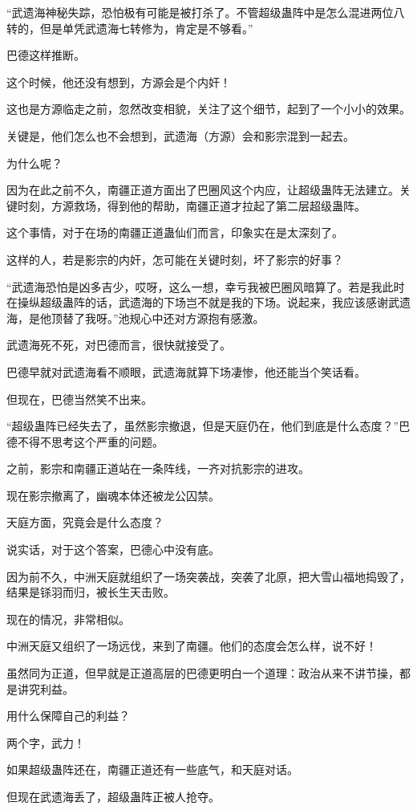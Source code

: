 \begin{this_body}
“武遗海神秘失踪，恐怕极有可能是被打杀了。不管超级蛊阵中是怎么混进两位八转的，但是单凭武遗海七转修为，肯定是不够看。”

巴德这样推断。

这个时候，他还没有想到，方源会是个内奸！

这也是方源临走之前，忽然改变相貌，关注了这个细节，起到了一个小小的效果。

关键是，他们怎么也不会想到，武遗海（方源）会和影宗混到一起去。

为什么呢？

因为在此之前不久，南疆正道方面出了巴圈风这个内应，让超级蛊阵无法建立。关键时刻，方源救场，得到他的帮助，南疆正道才拉起了第二层超级蛊阵。

这个事情，对于在场的南疆正道蛊仙们而言，印象实在是太深刻了。

这样的人，若是影宗的内奸，怎可能在关键时刻，坏了影宗的好事？

“武遗海恐怕是凶多吉少，哎呀，这么一想，幸亏我被巴圈风暗算了。若是我此时在操纵超级蛊阵的话，武遗海的下场岂不就是我的下场。说起来，我应该感谢武遗海，是他顶替了我呀。”池规心中还对方源抱有感激。

武遗海死不死，对巴德而言，很快就接受了。

巴德早就对武遗海看不顺眼，武遗海就算下场凄惨，他还能当个笑话看。

但现在，巴德当然笑不出来。

“超级蛊阵已经失去了，虽然影宗撤退，但是天庭仍在，他们到底是什么态度？”巴德不得不思考这个严重的问题。

之前，影宗和南疆正道站在一条阵线，一齐对抗影宗的进攻。

现在影宗撤离了，幽魂本体还被龙公囚禁。

天庭方面，究竟会是什么态度？

说实话，对于这个答案，巴德心中没有底。

因为前不久，中洲天庭就组织了一场突袭战，突袭了北原，把大雪山福地捣毁了，结果是铩羽而归，被长生天击败。

现在的情况，非常相似。

中洲天庭又组织了一场远伐，来到了南疆。他们的态度会怎么样，说不好！

虽然同为正道，但早就是正道高层的巴德更明白一个道理：政治从来不讲节操，都是讲究利益。

用什么保障自己的利益？

两个字，武力！

如果超级蛊阵还在，南疆正道还有一些底气，和天庭对话。

但现在武遗海丢了，超级蛊阵正被人抢夺。


\end{this_body}

